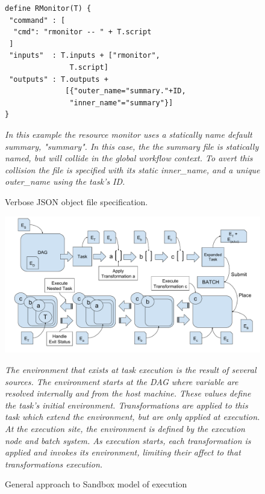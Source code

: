 \documentclass[conference]{IEEEtran}
\begin{document}
\begin{figure}[h]
\begin{framed}
\small
\begin{verbatim}
define RMonitor(T) {
 "command" : [
  "cmd": "rmonitor -- " + T.script
 ]
 "inputs"  : T.inputs + ["rmonitor",
               T.script]
 "outputs" : T.outputs +
              [{"outer_name="summary."+ID, 
               "inner_name"="summary"}]
}
\end{verbatim}
\end{framed}
\caption{Verbose JSON object file specification.} 
\small
\emph{In this example the resource monitor uses
a statically name default summary, "summary".
In this case, the the summary 
file is statically named, but will collide in
the global workflow context. To avert this
collision the file is specified with its 
static inner\_name, and a unique outer\_name
using the task's ID.}
\label{json-file}
\end{figure}


\begin{figure}[t]
\includegraphics[width=\textwidth]{graphics/environment_extrapolation_pwrap.pdf}
\caption{General approach to Sandbox model of execution}
\small
\emph{The environment that exists at task execution is
the result of several sources. 
The environment starts at the DAG where 
variable are resolved internally and from the host machine.
These values define the task's initial environment.
Transformations are applied to this task which extend the
environment, but are only applied at execution. 
At the execution site, the environment is
defined by the execution node and batch system.
As execution starts, each transformation is
applied and invokes its environment, limiting 
their affect to that transformations execution.}
\label{figure:env-extrap}
\end{figure}
\end{document}
